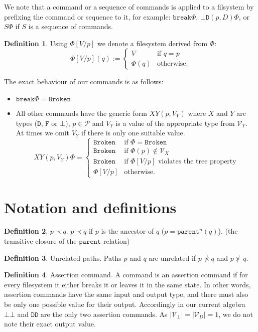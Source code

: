 \documentclass[12pt]{article}
\newcommand{\setvx}[1]{\mathcal{V}_{#1}}
\newcommand{\setd}{\setvx{D}}
\newcommand{\setb}{\setvx{\empt}}
\newcommand{\setp}{\mathcal{P}}
\newcommand{\empt}{\bot}
\newcommand{\parent}{\mathtt{parent}}
\newcommand{\fsbroken}{\mathtt{Broken}} %
\newcommand{\FS}{\Phi} %
\newcommand{\cbrk}{\mathtt{break}}
\newcommand{\fscommand}[2]{{#1#2}}
\newcommand{\fsregcommandchar}[1]{\mathtt{#1}}
\newcommand{\fsregcommand}[2]{\fscommand{\fsregcommandchar{#1}}{\fsregcommandchar{#2}}}
\newcommand{\cbb}{\fsregcommand{\empt}{\empt}}
\newcommand{\cbd}{\fsregcommand{\empt}{D}}
\newcommand{\cdd}{\fsregcommand{D}{D}}
\newcommand{\cxy}{\fscommand{X}{Y}}
\newcommand{\descendant}{\prec}
\newcommand{\ancestor}{\succ}
\theoremstyle{definition}
\newtheorem{mydef}{Definition}
\begin{document}
We note that a command or a sequence of commands is applied to a filsystem
by prefixing the command or sequence to it, for example: $\cbrk\FS$, $\cbd(p,D)\FS$, 
or $S\FS$ if $S$ is a sequence of commands.

\begin{mydef}
Using $\FS[V/p]$ we denote a filesystem derived from $\FS$:
\[ \FS[V/p](q) :=
   \begin{cases}
   V &\mbox{if~} q=p\\
   \FS(q) &\mbox{otherwise.}
   \end{cases}
\]
\end{mydef}

The exact behaviour of our commands is as follows:
\begin{itemize}
\item $\cbrk\FS = \fsbroken$
\item
All other commands have the generic form $\cxy(p,V_Y)$ where
$X$ and $Y$ are types ($\fsregcommandchar{D}$, $\fsregcommandchar{F}$ or $\fsregcommandchar{\empt}$),
$p\in\setp$ and $V_Y$ is a value of the appropriate type from $\setvx{Y}$.
At times we omit $V_Y$ if there is only one suitable value.
\[ \cxy(p,V_Y)\FS = 
   \begin{cases}
   \fsbroken &\mbox{if~} \FS=\fsbroken\\
   \fsbroken &\mbox{if~} \FS(p)\not\in\setvx{X}\\
   \fsbroken &\mbox{if~} \FS[V/p] \mbox{~violates the tree property}\\
   \FS[V/p] &\mbox{otherwise.}
   \end{cases}
\]
\end{itemize}

\section{Notation and definitions}

\begin{mydef}{$p\descendant q$.}
$p\descendant q$ if $p$ is the ancestor of $q$ ($p=\parent^n(q)$). (the transitive closure of the $\parent$ relation)
\end{mydef}

\begin{mydef}{Unrelated paths.}
Paths $p$ and $q$ are unrelated if $p\not\descendant q$ and $p\not\ancestor q$.
\end{mydef}

\begin{mydef}{Assertion command.}
A command is an assertion command if
for every filesystem it either breaks it or leaves it in the same state.
In other words, assertion commands have the same input and output type,
and there must also be only one possible value for their output.
Accordingly in our current algebra $\cbb$ and $\cdd$ are the only two assertion commands.
As $|\setb|=|\setd|=1$, we do not note their exact output value.
\end{mydef}
\end{document}
